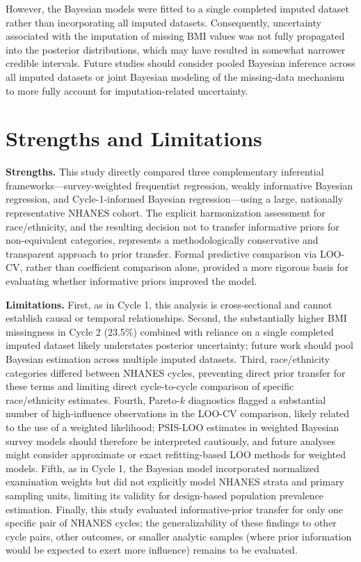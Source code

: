 \documentclass[11pt]{article}
\begin{document}
However, the Bayesian models were fitted to a single completed imputed
dataset rather than incorporating all imputed datasets. Consequently,
uncertainty associated with the imputation of missing BMI values was not
fully propagated into the posterior distributions, which may have resulted
in somewhat narrower credible intervals. Future studies should consider
pooled Bayesian inference across all imputed datasets or joint Bayesian
modeling of the missing-data mechanism to more fully account for
imputation-related uncertainty.

\section{Strengths and Limitations}

\textbf{Strengths.} This study directly compared three complementary
inferential frameworks---survey-weighted frequentist regression,
weakly informative Bayesian regression, and Cycle-1-informed Bayesian
regression---using a large, nationally representative NHANES cohort. The
explicit harmonization assessment for race/ethnicity, and the resulting
decision not to transfer informative priors for non-equivalent categories,
represents a methodologically conservative and transparent approach to
prior transfer. Formal predictive comparison via LOO-CV, rather than
coefficient comparison alone, provided a more rigorous basis for evaluating
whether informative priors improved the model.

\textbf{Limitations.} First, as in Cycle 1, this analysis is cross-sectional
and cannot establish causal or temporal relationships. Second, the
substantially higher BMI missingness in Cycle 2 (23.5\%) combined with
reliance on a single completed imputed dataset likely understates posterior
uncertainty; future work should pool Bayesian estimation across multiple
imputed datasets. Third, race/ethnicity categories differed between NHANES
cycles, preventing direct prior transfer for these terms and limiting
direct cycle-to-cycle comparison of specific race/ethnicity estimates.
Fourth, Pareto-$k$ diagnostics flagged a substantial number of high-influence
observations in the LOO-CV comparison, likely related to the use of a
weighted likelihood; PSIS-LOO estimates in weighted Bayesian survey models
should therefore be interpreted cautiously, and future analyses might
consider approximate or exact refitting-based LOO methods for weighted
models. Fifth, as in Cycle 1, the Bayesian model incorporated normalized
examination weights but did not explicitly model NHANES strata and primary
sampling units, limiting its validity for design-based population
prevalence estimation. Finally, this study evaluated informative-prior
transfer for only one specific pair of NHANES cycles; the generalizability
of these findings to other cycle pairs, other outcomes, or smaller analytic
samples (where prior information would be expected to exert more influence)
remains to be evaluated.
\end{document}
